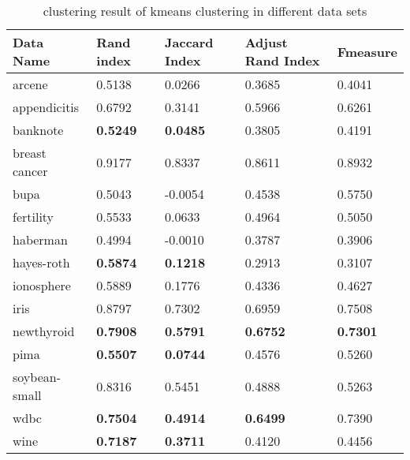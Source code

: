 	    \begin{table}[htb]
	      \centering
	      \caption{clustering result of kmeans clustering in different data sets}
	      \label{my-label}
	      \begin{tabular}{|lllll|} \hline
	         Data Name & Rand index  & Jaccard Index  & Adjust Rand Index & F\-measure  \\ \hline
	         arcene         & 0.5138 & 0.0266 & 0.3685 & 0.4041  \\ 
	         appendicitis   & 0.6792 & 0.3141 & 0.5966 & 0.6261  \\ 
	         banknote       & \textbf{0.5249} & \textbf{0.0485} & 0.3805& 0.4191  \\ 
	         breast cancer  & 0.9177 & 0.8337 & 0.8611 & 0.8932 \\ 
	         bupa           & 0.5043 & -0.0054 & 0.4538 & 0.5750 \\ 
	         fertility      & 0.5533 & 0.0633 & 0.4964 & 0.5050 \\ 
	         haberman       & 0.4994 & -0.0010 & 0.3787 & 0.3906 \\ 
	         hayes-roth     & \textbf{0.5874} & \textbf{0.1218} & 0.2913 & 0.3107 \\ 
	         ionosphere     & 0.5889 & 0.1776 & 0.4336 & 0.4627 \\ 
	         iris           & 0.8797 & 0.7302 & 0.6959 & 0.7508 \\ 
		     newthyroid     & \textbf{0.7908} & \textbf{0.5791} & \textbf{0.6752} & \textbf{0.7301} \\ 
	         pima           & \textbf{0.5507} & \textbf{0.0744} & 0.4576 & 0.5260 \\ 
	         soybean-small  & 0.8316 & 0.5451 & 0.4888 & 0.5263 \\ 
	         wdbc           & \textbf{0.7504} & \textbf{0.4914} & \textbf{0.6499} & 0.7390 \\ 
	         wine           & \textbf{0.7187} & \textbf{0.3711} & 0.4120 & 0.4456 \\ 
	         \hline
	      \end{tabular}
	    \end{table}
		
